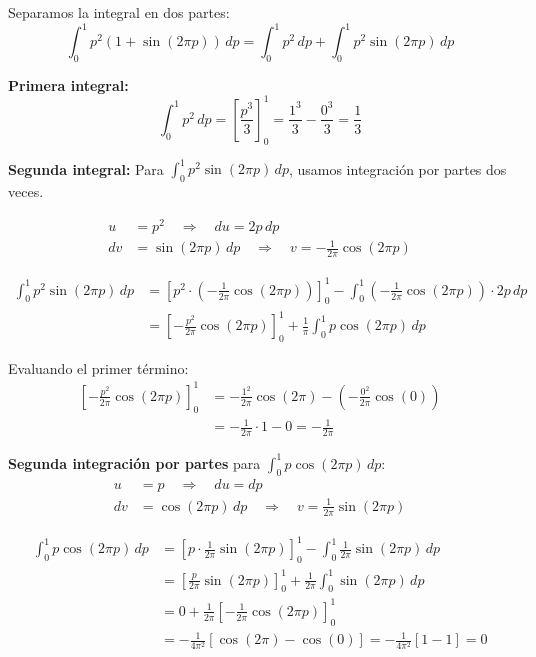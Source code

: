\documentclass[
  11pt,
  letterpaper,
   addpoints,
  answers
  ]{exam}
\begin{document}
\begin{questions}
\begin{solution}
Separamos la integral en dos partes:
\begin{equation}
\int_0^1 p^2(1 + \sin(2\pi p)) \, dp = \int_0^1 p^2 \, dp + \int_0^1 p^2 \sin(2\pi p) \, dp
\end{equation}

\textbf{Primera integral:}
\begin{equation}
\int_0^1 p^2 \, dp = \left[\frac{p^3}{3}\right]_0^1 = \frac{1^3}{3} - \frac{0^3}{3} = \frac{1}{3}
\end{equation}

\textbf{Segunda integral:}
Para $\int_0^1 p^2 \sin(2\pi p) \, dp$, usamos integración por partes dos veces.

\begin{align}
u &= p^2 \quad \Rightarrow \quad du = 2p \, dp \\
dv &= \sin(2\pi p) \, dp \quad \Rightarrow \quad v = -\frac{1}{2\pi}\cos(2\pi p)
\end{align}

\begin{align}
\int_0^1 p^2 \sin(2\pi p) \, dp &= \left[p^2 \cdot \left(-\frac{1}{2\pi}\cos(2\pi p)\right)\right]_0^1 - \int_0^1 \left(-\frac{1}{2\pi}\cos(2\pi p)\right) \cdot 2p \, dp \\
&= \left[-\frac{p^2}{2\pi}\cos(2\pi p)\right]_0^1 + \frac{1}{\pi}\int_0^1 p \cos(2\pi p) \, dp
\end{align}

Evaluando el primer término:
\begin{align}
\left[-\frac{p^2}{2\pi}\cos(2\pi p)\right]_0^1 &= -\frac{1^2}{2\pi}\cos(2\pi) - \left(-\frac{0^2}{2\pi}\cos(0)\right) \\
&= -\frac{1}{2\pi} \cdot 1 - 0 = -\frac{1}{2\pi}
\end{align}

\textbf{Segunda integración por partes} para $\int_0^1 p \cos(2\pi p) \, dp$:
\begin{align}
u &= p \quad \Rightarrow \quad du = dp \\
dv &= \cos(2\pi p) \, dp \quad \Rightarrow \quad v = \frac{1}{2\pi}\sin(2\pi p)
\end{align}

\begin{align}
\int_0^1 p \cos(2\pi p) \, dp &= \left[p \cdot \frac{1}{2\pi}\sin(2\pi p)\right]_0^1 - \int_0^1 \frac{1}{2\pi}\sin(2\pi p) \, dp \\
&= \left[\frac{p}{2\pi}\sin(2\pi p)\right]_0^1 + \frac{1}{2\pi}\int_0^1 \sin(2\pi p) \, dp \\
&= 0 + \frac{1}{2\pi} \left[-\frac{1}{2\pi}\cos(2\pi p)\right]_0^1 \\
&= -\frac{1}{4\pi^2}[\cos(2\pi) - \cos(0)] = -\frac{1}{4\pi^2}[1 - 1] = 0
\end{align}


\end{solution}
\end{questions}
\end{document}

